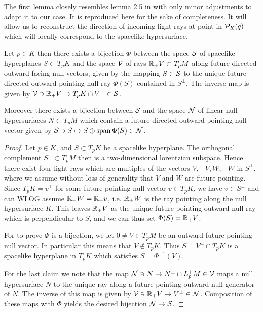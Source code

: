 The first lemma closely resembles lemma 2.5 in \cite{hintzpaper} with only minor adjustments to adapt it to our case. It is reproduced here for the sake of completeness. It will allow us to reconstruct the direction of incoming light rays at point in ${\mathcal{P}}_K(q)$ which will locally correspond to the spacelike hypersurface.
\begin{lemma}\label{lem:dirreconstr}
Let $p\in K$ then there exists a bijection $\Phi$ between the space ${\mathcal{S}}$ of spacelike hyperplanes $S\subset T_pK$ and the space ${\mathcal{V}}$ of rays $\mathbb{R}_+V\subset T_pM$ along future-directed outward facing null vectors, given by the mapping $S\in {\mathcal{S}}$ to the unique future-directed outward pointing null ray $\Phi(S)$ contained in $S^\perp$. The inverse map is given by ${\mathcal{V}}\ni \mathbb{R}_+V \mapsto T_pK \cap V^\perp\in {\mathcal{S}}$.

Moreover there exists a bijection between ${\mathcal{S}}$ and the space ${\mathcal{N}}$ of linear null hypersurfaces $N\subset T_pM$ which contain a future-directed outward pointing null vector given by ${\mathcal{S}}\ni S\mapsto S\oplus \operatorname{span} \Phi(S)\in {\mathcal{N}}$.
\end{lemma}
\begin{proof}
    Let $p\in K$, and $S\subset T_pK$ be a spacelike hyperplane. The orthogonal complement $S^\perp\subset T_pM$ then is a two-dimensional lorentzian subspace. Hence there exist four light rays which are multiples of the vectors $V,-V,W,-W$ in $S^\perp$, where we assume without loss of generality that $V$ and $W$ are future-pointing. Since $T_pK=v^\perp$ for some future-pointing null vector $v\in T_pK$, we have $v\in S^\perp$ and can WLOG assume $\mathbb{R}_+W=\mathbb{R}_+v$, i.e. $\mathbb{R}_+W$ is the ray pointing along the null hypersurface $K$. This leaves $\mathbb{R}_+V$ as the unique future-pointing outward null ray which is perpendicular to $S$, and we can thus set $\Phi(S)=\mathbb{R}_+V$.

    For to prove $\Phi$ is a bijection, we let $0\neq V\in T_pM$ be an outward future-pointing null vector. In particular this means that $V\notin T_pK$. Thus $S=V^\perp\cap T_pK$ is a spacelike hyperplane in $T_pK$ which satisfies $S=\Phi^{-1}(V)$.

    For the last claim we note that the map ${\mathcal{N}}\ni N \mapsto N^\perp \cap L^+_pM \in {\mathcal{V}}$ maps a null hypersurface $N$ to the unique ray along a future-pointing outward null generator of $N$. The inverse of this map is given by ${\mathcal{V}}\ni \mathbb{R}_+V\mapsto V^\perp \in {\mathcal{N}}$. Composition of these maps with $\Phi$ yields the desired bijection ${\mathcal{N}}\to {\mathcal{S}}$.
\end{proof}


